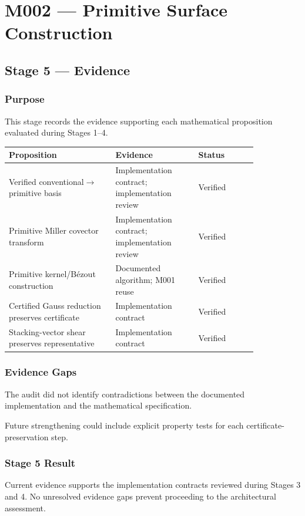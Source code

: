 
\chapter{M002 --- Primitive Surface Construction}

\section{Stage 5 --- Evidence}

\subsection{Purpose}

This stage records the evidence supporting each mathematical proposition
evaluated during Stages 1--4.

\begin{center}
\begin{tabular}{|p{0.36\linewidth}|p{0.28\linewidth}|p{0.20\linewidth}|}
\hline
Proposition & Evidence & Status\\
\hline
Verified conventional$\rightarrow$primitive basis &
Implementation contract; implementation review &
Verified\\
\hline
Primitive Miller covector transform &
Implementation contract; implementation review &
Verified\\
\hline
Primitive kernel/B\'ezout construction &
Documented algorithm; M001 reuse &
Verified\\
\hline
Certified Gauss reduction preserves certificate &
Implementation contract &
Verified\\
\hline
Stacking-vector shear preserves representative &
Implementation contract &
Verified\\
\hline
\end{tabular}
\end{center}

\subsection{Evidence Gaps}

The audit did not identify contradictions between the documented
implementation and the mathematical specification.

Future strengthening could include explicit property tests for each
certificate-preservation step.

\subsection{Stage 5 Result}

Current evidence supports the implementation contracts reviewed during
Stages 3 and 4. No unresolved evidence gaps prevent proceeding to the
architectural assessment.
